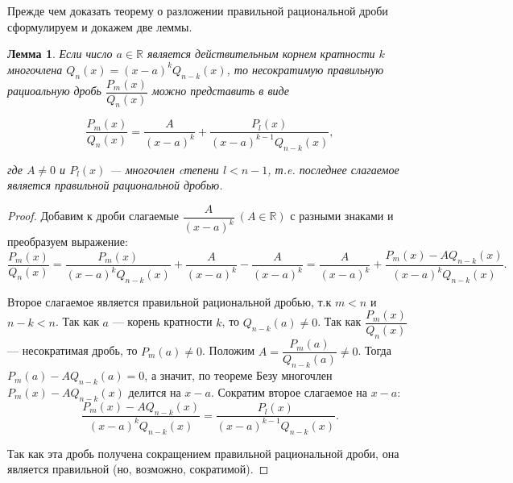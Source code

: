 \documentclass[12pt]{report}
\numberwithin{equation}{section}
\newtheorem{lemma}{Лемма}[section]
\begin{document}
Прежде чем доказать теорему о разложении правильной рациональной дроби сформулируем и докажем две леммы.
\begin{lemma} \label{lemm:1:1}
Если число $a \in \mathbb{R}$  является действительным корнем кратности $k$ многочлена $Q_n(x) = (x-a)^k Q_{n-k}(x)$, то несократимую правильную рациоальную дробь $\dfrac{P_m(x)}{Q_n(x)}$ можно представить в виде

\[\frac{P_m(x)}{Q_n(x)} = \frac{A}{(x-a)^k} + \frac{P_l(x)}{(x-a)^{k-1}Q_{n-k}(x)}, \]

где $A \neq 0$ и $P_l(x)$ ---  многочлен cтепени $l < n - 1$,  т.e. последнее слагаемое является правильной рациональной дробью.
\end{lemma}
\begin{proof}
Добавим к дроби слагаемые $\dfrac{A}{(x-a)^k}~(A \in \mathbb{R})$ с разными знаками и преобразуем выражение:
\[ \frac{P_m(x)}{Q_n(x)} =\frac{P_m(x)}{(x-a)^k Q_{n-k}(x)} + \frac{A}{(x-a)^k} - \frac{A}{(x-a)^k} =  \frac{A}{(x-a)^k} + \frac{P_m(x) - AQ_{n-k}(x)}{(x-a)^k Q_{n-k}(x)}.\]

Второе слагаемое является правильной рациональной дробью, т.к $m < n$ и $n -k < n$. Так как $a$ — корень кратности $k$, то $Q_{n-k}(a) \neq 0$. Так как $\dfrac{P_m(x)}{Q_n(x)}$ --- несократимая дробь, то $P_m(a) \neq 0$. Положим $A = \dfrac{P_m(a)}{Q_{n-k}(a)} \neq 0$. Тогда $P_m(a) - AQ_{n-k}(a) = 0$, а значит, по теореме Безу многочлен $P_m(x) - A Q_{n-k}(x)$ делится на $x-a$. Сократим второе слагаемое на $x-a$:
\begin{equation}\label{eq:1:2}
\frac{P_m(x) - AQ_{n-k}(x)}{(x-a)^kQ_{n-k}(x)} = \frac{P_l(x)}{(x-a)^{k-1} Q_{n-k}(x)}. 
\end{equation}

Так как эта дробь получена сокращением правильной рациональной дроби, она является правильной (но, возможно, сократимой). 
\end{proof}
\end{document}
